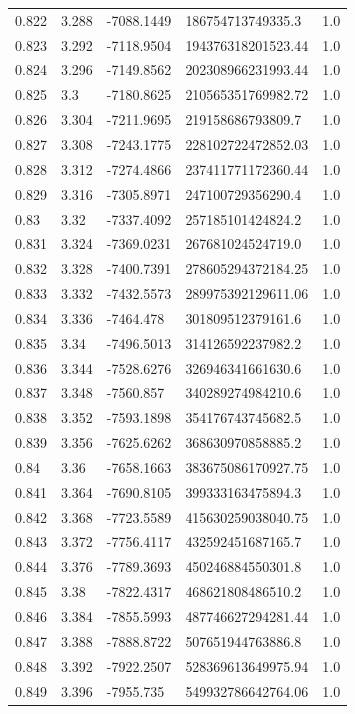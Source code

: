 \begin{tabular}{lllll}
0.822 & 3.288 & -7088.1449 & 186754713749335.3 & 1.0 \\
0.823 & 3.292 & -7118.9504 & 194376318201523.44 & 1.0 \\
0.824 & 3.296 & -7149.8562 & 202308966231993.44 & 1.0 \\
0.825 & 3.3 & -7180.8625 & 210565351769982.72 & 1.0 \\
0.826 & 3.304 & -7211.9695 & 219158686793809.7 & 1.0 \\
0.827 & 3.308 & -7243.1775 & 228102722472852.03 & 1.0 \\
0.828 & 3.312 & -7274.4866 & 237411771172360.44 & 1.0 \\
0.829 & 3.316 & -7305.8971 & 247100729356290.4 & 1.0 \\
0.83 & 3.32 & -7337.4092 & 257185101424824.2 & 1.0 \\
0.831 & 3.324 & -7369.0231 & 267681024524719.0 & 1.0 \\
0.832 & 3.328 & -7400.7391 & 278605294372184.25 & 1.0 \\
0.833 & 3.332 & -7432.5573 & 289975392129611.06 & 1.0 \\
0.834 & 3.336 & -7464.478 & 301809512379161.6 & 1.0 \\
0.835 & 3.34 & -7496.5013 & 314126592237982.2 & 1.0 \\
0.836 & 3.344 & -7528.6276 & 326946341661630.6 & 1.0 \\
0.837 & 3.348 & -7560.857 & 340289274984210.6 & 1.0 \\
0.838 & 3.352 & -7593.1898 & 354176743745682.5 & 1.0 \\
0.839 & 3.356 & -7625.6262 & 368630970858885.2 & 1.0 \\
0.84 & 3.36 & -7658.1663 & 383675086170927.75 & 1.0 \\
0.841 & 3.364 & -7690.8105 & 399333163475894.3 & 1.0 \\
0.842 & 3.368 & -7723.5589 & 415630259038040.75 & 1.0 \\
0.843 & 3.372 & -7756.4117 & 432592451687165.7 & 1.0 \\
0.844 & 3.376 & -7789.3693 & 450246884550301.8 & 1.0 \\
0.845 & 3.38 & -7822.4317 & 468621808486510.2 & 1.0 \\
0.846 & 3.384 & -7855.5993 & 487746627294281.44 & 1.0 \\
0.847 & 3.388 & -7888.8722 & 507651944763886.8 & 1.0 \\
0.848 & 3.392 & -7922.2507 & 528369613649975.94 & 1.0 \\
0.849 & 3.396 & -7955.735 & 549932786642764.06 & 1.0 \\

\end{tabular}
